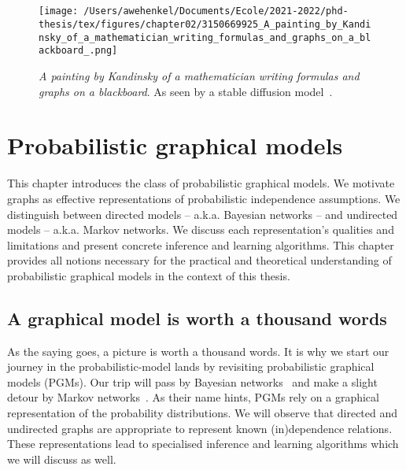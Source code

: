 \thispagestyle{empty}
\section*{}

\vfill

\begin{figure}[h]
  \centering

  \texttt{[image: /Users/awehenkel/Documents/Ecole/2021-2022/phd-thesis/tex/figures/chapter02/3150669925\_A\_painting\_by\_Kandinsky\_of\_a\_mathematician\_writing\_formulas\_and\_graphs\_on\_a\_blackboard\_.png]}
  \caption{\textit{A painting by Kandinsky of a mathematician writing formulas and graphs on a blackboard}. As seen by a stable diffusion model~\citep{rombach2022high}.}\label{}
\end{figure}

\vfill

%


\chapter{Probabilistic graphical models}\label{ch:02B}

\begin{chapter_outline}

This chapter introduces the class of probabilistic graphical models. We motivate graphs as effective representations of probabilistic independence assumptions. We distinguish between directed models -- a.k.a. Bayesian networks -- and undirected models -- a.k.a. Markov networks. We discuss each representation's qualities and limitations and present concrete inference and learning algorithms. This chapter provides all notions necessary for the practical and theoretical understanding of probabilistic graphical models in the context of this thesis.
\end{chapter_outline}

\section{A graphical model is worth a thousand words}
As the saying goes, a picture is worth a thousand words. It is why we start our journey in the probabilistic-model lands by revisiting probabilistic graphical models (PGMs). Our trip will pass by Bayesian networks~\citep{pearl2011bayesian} and make a slight detour by Markov networks~\citep{kindermann1980markov}. As their name hints, PGMs rely on a graphical representation of the probability distributions. We will observe that directed and undirected graphs are appropriate to represent known (in)dependence relations. These representations lead to specialised inference and learning algorithms which we will discuss as well.

